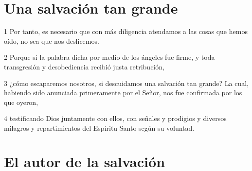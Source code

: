 \section*{Una salvación tan grande}

\par 1 Por tanto, es necesario que con más diligencia atendamos a las cosas que hemos oído, no sea que nos deslicemos.
\par 2 Porque si la palabra dicha por medio de los ángeles fue firme, y toda transgresión y desobediencia recibió justa retribución,
\par 3 ¿cómo escaparemos nosotros, si descuidamos una salvación tan grande? La cual, habiendo sido anunciada primeramente por el Señor, nos fue confirmada por los que oyeron,
\par 4 testificando Dios juntamente con ellos, con señales y prodigios y diversos milagros y repartimientos del Espíritu Santo según su voluntad.

\section*{El autor de la salvación}

